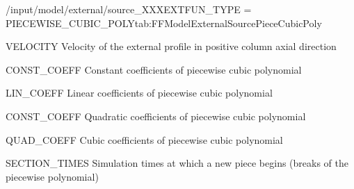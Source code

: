 \begin{condsubgroup}{/input/model/external/source\_XXX}{EXTFUN\_TYPE = PIECEWISE\_CUBIC\_POLY}{tab:FFModelExternalSourcePieceCubicPoly}
  \begin{dataset}[type=double,unit=\si{\per\second},range={$\geq 0$},length=1]{VELOCITY}
    Velocity of the external profile in positive column axial direction
  \end{dataset}
  \begin{dataset}[type=double,unit=\si{\ExternalUnit},range={$\mathds{R}$},length=Arbitrary]{CONST\_COEFF}
    Constant coefficients of piecewise cubic polynomial
  \end{dataset}
  \begin{dataset}[type=double,unit=\si{\ExternalUnit\per\second},range={$\mathds{R}$},length={Same as \texttt{CONST\_COEFF}}]{LIN\_COEFF}
    Linear coefficients of piecewise cubic polynomial
  \end{dataset}
  \begin{dataset}[type=double,unit=\si{\ExternalUnit\per\square\second},range={$\mathds{R}$},length={Same as \texttt{CONST\_COEFF}}]{CONST\_COEFF}
    Quadratic coefficients of piecewise cubic polynomial
  \end{dataset}
  \begin{dataset}[type=double,unit=\si{\ExternalUnit\per\cubic\second},range={$\mathds{R}$},length={Same as \texttt{CONST\_COEFF}}]{QUAD\_COEFF}
    Cubic coefficients of piecewise cubic polynomial
  \end{dataset}
  \begin{dataset}[type=double,unit=\si{\second},range={$\geq 0.0$},length={\texttt{CONST\_COEFF}+1}]{SECTION\_TIMES}
    Simulation times at which a new piece begins (breaks of the piecewise polynomial)
  \end{dataset}
\end{condsubgroup}

